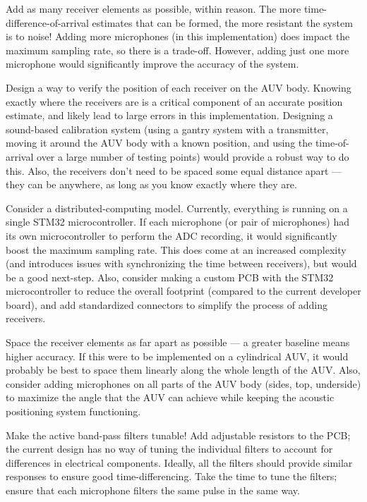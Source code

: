 \documentclass[11pt]{ucthesisCP}
\begin{document}
Add as many receiver elements as possible, within reason. The more time-difference-of-arrival estimates that can be formed, the more resistant the system is to noise! Adding more microphones (in this implementation) does impact the maximum sampling rate, so there is a trade-off. However, adding just one more microphone would significantly improve the accuracy of the system.

Design a way to verify the position of each receiver on the AUV body. Knowing exactly where the receivers are is a critical component of an accurate position estimate, and likely lead to large errors in this implementation. Designing a sound-based calibration system (using a gantry system with a transmitter, moving it around the AUV body with a known position, and using the time-of-arrival over a large number of testing points) would provide a robust way to do this. Also, the receivers don’t need to be spaced some equal distance apart --- they can be anywhere, as long as you know exactly where they are.

Consider a distributed-computing model. Currently, everything is running on a single STM32 microcontroller. If each microphone (or pair of microphones) had its own microcontroller to perform the ADC recording, it would significantly boost the maximum sampling rate. This does come at an increased complexity (and introduces issues with synchronizing the time between receivers), but would be a good next-step. Also, consider making a custom PCB with the STM32 microcontroller to reduce the overall footprint (compared to the current developer board), and add standardized connectors to simplify the process of adding receivers.

Space the receiver elements as far apart as possible --- a greater baseline means higher accuracy. If this were to be implemented on a cylindrical AUV, it would probably be best to space them linearly along the whole length of the AUV. Also, consider adding microphones on all parts of the AUV body (sides, top, underside) to maximize the angle that the AUV can achieve while keeping the acoustic positioning system functioning.

Make the active band-pass filters tunable! Add adjustable resistors to the PCB; the current design has no way of tuning the individual filters to account for differences in electrical components. Ideally, all the filters should provide similar responses to ensure good time-differencing. Take the time to tune the filters; ensure that each microphone filters the same pulse in the same way.
\end{document}
